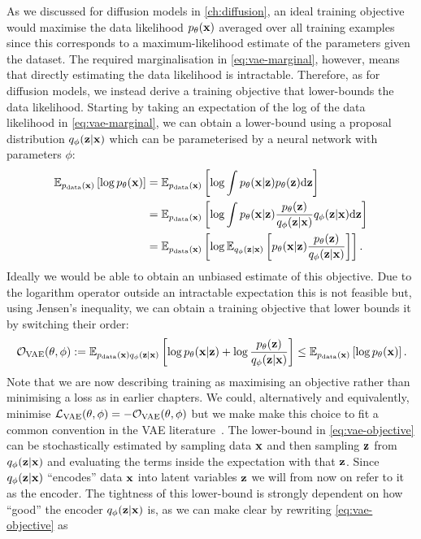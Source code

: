 As we discussed for diffusion models in \cref{ch:diffusion}, an ideal training objective would maximise the data likelihood $p_\theta({\mathbf{x}})$ averaged over all training examples since this corresponds to a maximum-likelihood estimate of the parameters given the dataset. The required marginalisation in \cref{eq:vae-marginal}, however, means that directly estimating the data likelihood is intractable. Therefore, as for diffusion models, we instead derive a training objective that lower-bounds the data likelihood. Starting by taking an expectation of the log of the data likelihood in \cref{eq:vae-marginal}, we can obtain a lower-bound using a proposal distribution $q_\phi({\mathbf{z}}|{\mathbf{x}})$ which can be parameterised by a neural network with parameters $\phi$: %
\begin{align}
    \mathbb{E}_{p_{\rm{data}}({\mathbf{x}})} \left[ \log p_\theta({\mathbf{x}}) \right] &= \mathbb{E}_{p_{\rm{data}}({\mathbf{x}})} \left[ \log \int p_\theta({\mathbf{x}}|{\mathbf{z}})p_\theta({\mathbf{z}}) \mathrm{d}{\mathbf{z}} \right] \\
    &= \mathbb{E}_{p_{\rm{data}}({\mathbf{x}})} \left[ \log \int p_\theta({\mathbf{x}}|{\mathbf{z}}) \frac{p_\theta({\mathbf{z}})}{q_\phi({\mathbf{z}}|{\mathbf{x}})} q_\phi({\mathbf{z}}|{\mathbf{x}}) \mathrm{d}{\mathbf{z}} \right] \\
    &= \mathbb{E}_{p_{\rm{data}}({\mathbf{x}})} \left[ \log \mathbb{E}_{q_\phi({\mathbf{z}}|{\mathbf{x}})} \left[ p_\theta({\mathbf{x}}|{\mathbf{z}}) \frac{p_\theta({\mathbf{z}})}{q_\phi({\mathbf{z}}|{\mathbf{x}})} \right] \right]. \label{eq:vae-marginal-is}
\end{align}
Ideally we would be able to obtain an unbiased estimate of this objective. Due to the logarithm operator outside an intractable expectation this is not feasible but, using Jensen's inequality, we can obtain a training objective that lower bounds it by switching their order: 
\begin{align}
    {\mathcal{O}}_\text{VAE}(\theta, \phi) := \mathbb{E}_{p_{\rm{data}}({\mathbf{x}})q_\phi({\mathbf{z}}|{\mathbf{x}})} \left[ \log p_\theta({\mathbf{x}}|{\mathbf{z}}) + \log \frac{p_\theta({\mathbf{z}})}{q_\phi({\mathbf{z}}|{\mathbf{x}})} \right] \leq \mathbb{E}_{p_{\rm{data}}({\mathbf{x}})} \left[ \log p_\theta({\mathbf{x}}) \right].
    \label{eq:vae-objective}
\end{align}
Note that we are now describing training as maximising an objective rather than minimising a loss as in earlier chapters. We could, alternatively and equivalently, minimise ${\mathcal{L}}_\text{VAE}(\theta, \phi) = -{\mathcal{O}}_\text{VAE}(\theta, \phi)$ but we make make this choice to fit a common convention in the VAE literature~\citep{kingma2013auto,sohn2015learning,child2020very,vahdat2020nvae}. The lower-bound in \cref{eq:vae-objective} can be stochastically estimated by sampling data ${\mathbf{x}}$ and then sampling ${\mathbf{z}}$ from $q_\phi({\mathbf{z}}|{\mathbf{x}})$ and evaluating the terms inside the expectation with that ${\mathbf{z}}$. Since $q_\phi({\mathbf{z}}|{\mathbf{x}})$ ``encodes'' data ${\mathbf{x}}$ into latent variables ${\mathbf{z}}$ we will from now on refer to it as the encoder. The tightness of this lower-bound is strongly dependent on how ``good'' the encoder $q_\phi({\mathbf{z}}|{\mathbf{x}})$ is, as we can make clear by rewriting \cref{eq:vae-objective} as
